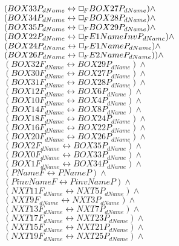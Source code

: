 \documentclass[a4paper,10pt]{article}
\begin{document}
 $ (BOX33P_{dName} \leftrightarrow  \Box_{\!F} BOX27P_{dName}) \land $ \\ 
 $ (BOX34P_{dName} \leftrightarrow  \Box_{\!F} BOX28P_{dName}) \land $ \\ 
 $ (BOX35P_{dName} \leftrightarrow  \Box_{\!F} BOX29P_{dName}) \land $ \\ 
 $ (BOX22P_{dName} \leftrightarrow  \Box_{\!F} E1NameInvP_{dName}) \land $ \\ 
 $ (BOX24P_{dName} \leftrightarrow  \Box_{\!F} E1NameP_{dName}) \land $ \\ 
 $ (BOX26P_{dName} \leftrightarrow  \Box_{\!F} E2NameP_{dName})) \land $ \\ 
 $ (BOX32F_{dName} \leftrightarrow BOX29P_{dName}) \land $ \\ 
 $ (BOX30F_{dName} \leftrightarrow BOX27P_{dName}) \land $ \\ 
 $ (BOX31F_{dName} \leftrightarrow BOX28P_{dName}) \land $ \\ 
 $ (BOX12F_{dName} \leftrightarrow BOX6P_{dName}) \land $ \\ 
 $ (BOX10F_{dName} \leftrightarrow BOX4P_{dName}) \land $ \\ 
 $ (BOX14F_{dName} \leftrightarrow BOX8P_{dName}) \land $ \\ 
 $ (BOX18F_{dName} \leftrightarrow BOX24P_{dName}) \land $ \\ 
 $ (BOX16F_{dName} \leftrightarrow BOX22P_{dName}) \land $ \\ 
 $ (BOX20F_{dName} \leftrightarrow BOX26P_{dName}) \land $ \\ 
 $ (BOX2F_{dName} \leftrightarrow BOX35P_{dName}) \land $ \\ 
 $ (BOX0F_{dName} \leftrightarrow BOX33P_{dName}) \land $ \\ 
 $ (BOX1F_{dName} \leftrightarrow BOX34P_{dName}) \land $ \\ 
 $ (PNameF \leftrightarrow PNameP) \land $ \\ 
 $ (PinvNameF \leftrightarrow PinvNameP) \land $ \\ 
 $ (NXT11F_{dName} \leftrightarrow NXT5P_{dName}) \land $ \\ 
 $ (NXT9F_{dName} \leftrightarrow NXT3P_{dName}) \land $ \\ 
 $ (NXT13F_{dName} \leftrightarrow NXT7P_{dName}) \land $ \\ 
 $ (NXT17F_{dName} \leftrightarrow NXT23P_{dName}) \land $ \\ 
 $ (NXT15F_{dName} \leftrightarrow NXT21P_{dName}) \land $ \\ 
 $ (NXT19F_{dName} \leftrightarrow NXT25P_{dName}) \land $ \\ 
\end{document}
